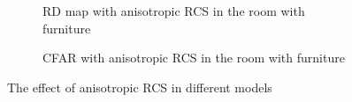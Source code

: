 \documentclass[12pt,DIV14,BCOR12mm,a4paper,footinclude=false,headinclude,parskip=half-,twoside,openright,cleardoublepage=empty,toc=index,bibliography=totoc,listof=totoc]{scrreprt}
\numberwithin{equation}{chapter}
\begin{document}
\begin{figure}[t]
\begin{subfigure}{0.45\textwidth}
            \centering
            \caption{RD map with anisotropic RCS in the room with furniture}
        \end{subfigure}\hspace{0.5cm}
        \begin{subfigure}{0.45\textwidth}
            \centering
            \caption{CFAR with anisotropic RCS in the room with furniture}
        \end{subfigure}
        \caption{The effect of anisotropic RCS in different models}
        \label{the effect of anisotropic RCS in different models}
\end{figure}
\end{document}
